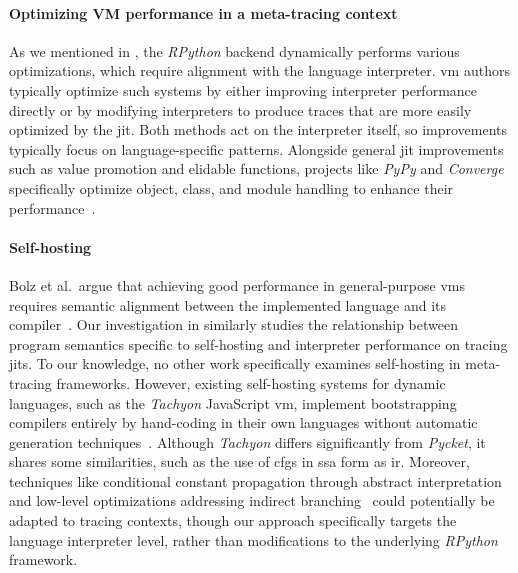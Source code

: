         \paragraph{Optimizing VM performance in a meta-tracing context}%
            As we mentioned in , the \emph{RPython} backend dynamically performs various optimizations, which require alignment with the language interpreter. \gls{vm} authors typically optimize such systems by either improving interpreter performance directly or by modifying interpreters to produce traces that are more easily optimized by the \gls{jit}. Both methods act on the interpreter itself, so improvements typically focus on language-specific patterns. Alongside general \gls{jit} improvements such as value promotion and elidable functions, projects like \emph{PyPy} and \emph{Converge} specifically optimize object, class, and module handling to enhance their performance~\cite{bolz15-meta-vm}.

        \paragraph{Self-hosting}%
            Bolz et al.\ argue that achieving good performance in general-purpose \glspl{vm} requires semantic alignment between the implemented language and its compiler~\cite{bolzHowNotWrite, runtime-feedback:11}. Our investigation in  similarly studies the relationship between program semantics specific to self-hosting and interpreter performance on tracing \glspl{jit}. To our knowledge, no other work specifically examines self-hosting in meta-tracing frameworks. However, existing self-hosting systems for dynamic languages, such as the \emph{Tachyon} JavaScript \gls{vm}, implement bootstrapping compilers entirely by hand-coding in their own languages without automatic generation techniques~\cite{self-hosted-tachyon}. Although \emph{Tachyon} differs significantly from \emph{Pycket}, it shares some similarities, such as the use of \glspl{cfg} in \gls{ssa} form as \gls{ir}. Moreover, techniques like conditional constant propagation through abstract interpretation~\cite{sccp:91} and low-level optimizations addressing indirect branching~\cite{branch-predict:03} could potentially be adapted to tracing contexts, though our approach specifically targets the language interpreter level, rather than modifications to the underlying \emph{RPython} framework.

